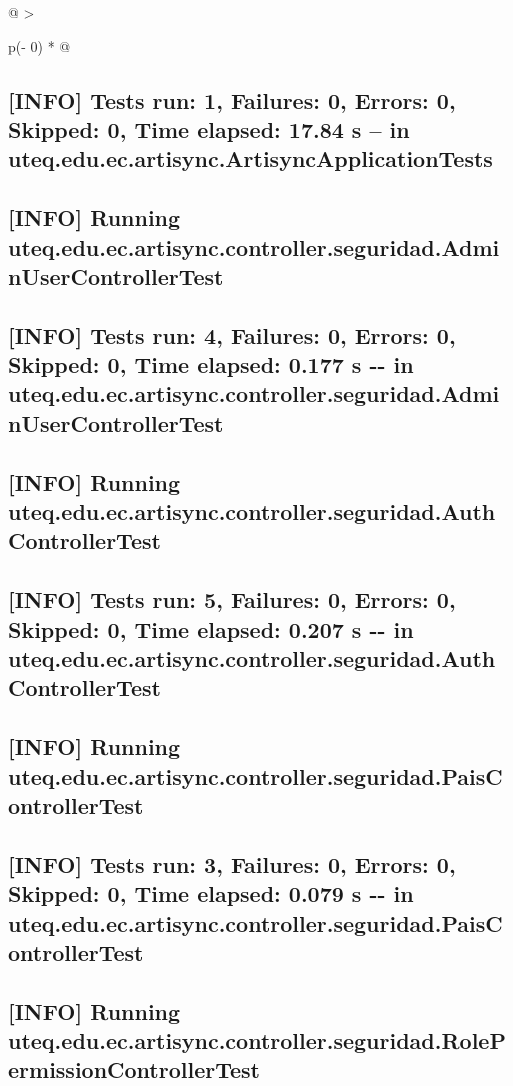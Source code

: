 \documentclass[
]{article}
\begin{document}
\begin{longtable}[]{@{}
  >{\raggedright\arraybackslash}p{(\columnwidth - 0\tabcolsep) * }@{}}
\toprule\noalign{}
\begin{minipage}[b]{\linewidth}\raggedright
\subsection{{[}INFO{]} Tests run: 1, Failures: 0, Errors: 0, Skipped: 0,
Time elapsed: 17.84 s -- in
uteq.edu.ec.artisync.ArtisyncApplicationTests}

\subsection{{[}INFO{]} Running
uteq.edu.ec.artisync.controller.seguridad.AdminUserControllerTest}

\subsection{{[}INFO{]} Tests run: 4, Failures: 0, Errors: 0, Skipped: 0,
Time elapsed: 0.177 s -\/- in
uteq.edu.ec.artisync.controller.seguridad.AdminUserControllerTest}

\subsection{{[}INFO{]} Running
uteq.edu.ec.artisync.controller.seguridad.AuthControllerTest}

\subsection{{[}INFO{]} Tests run: 5, Failures: 0, Errors: 0, Skipped: 0,
Time elapsed: 0.207 s -\/- in
uteq.edu.ec.artisync.controller.seguridad.AuthControllerTest}

\subsection{{[}INFO{]} Running
uteq.edu.ec.artisync.controller.seguridad.PaisControllerTest}

\subsection{{[}INFO{]} Tests run: 3, Failures: 0, Errors: 0, Skipped: 0,
Time elapsed: 0.079 s -\/- in
uteq.edu.ec.artisync.controller.seguridad.PaisControllerTest}

\subsection{\texorpdfstring{{[}INFO{]} Running
uteq.edu.ec.artisync.controller.seguridad.RolePermissionControllerTest
}{{[}INFO{]} Running uteq.edu.ec.artisync.controller.seguridad.RolePermissionControllerTest }}


\end{minipage}
\end{longtable}
\end{document}
